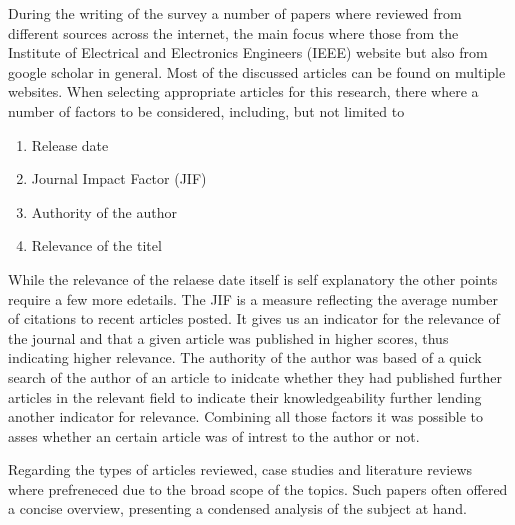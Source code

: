 During the writing of the survey a number of papers where reviewed from different sources across the internet, the main focus where those from the Institute of Electrical and Electronics Engineers (IEEE) website but also from google scholar in general. Most of the discussed articles can be found on multiple websites. When selecting  appropriate articles for this research, there where a number of factors to be considered, including, but not limited to

\begin{enumerate}
    \item Release date
    \item Journal Impact Factor (JIF)
    \item Authority of the author
    \item Relevance of the titel
\end{enumerate}

While the relevance of the relaese date itself is self explanatory the other points require a few more edetails. The JIF is a measure reflecting the average number of citations to recent articles posted. It gives us an indicator for the relevance of the journal and that a given article was published in higher scores, thus indicating higher relevance. The authority of the author was based of a quick search of the author of an article to inidcate whether they had published further articles in the relevant field to indicate their knowledgeability further lending another indicator for relevance. Combining all those factors it was possible to asses whether an certain article was of intrest to the author or not.

Regarding the types of articles reviewed,  case studies and literature reviews where prefreneced due to the broad scope of the topics. Such papers often offered a concise overview, presenting a condensed analysis of the subject at hand.